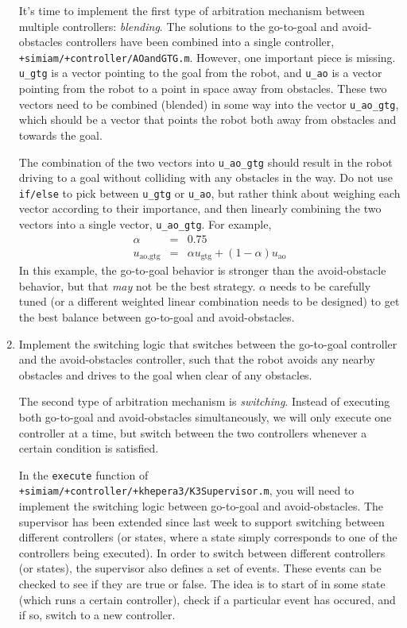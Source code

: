 \documentclass[10pt]{article}
\begin{document}
\begin{enumerate}
  It's time to implement the first type of arbitration mechanism between multiple controllers: \textit{blending}. The solutions to the go-to-goal and avoid-obstacles controllers have been combined into a single controller, \texttt{+simiam/+controller/AOandGTG.m}. However, one important piece is missing. \texttt{u\_gtg} is a vector pointing to the goal from the robot, and \texttt{u\_ao} is a vector pointing from the robot to a point in space away from obstacles. These two vectors need to be combined (blended) in some way into the vector \texttt{u\_ao\_gtg}, which should be a vector that points the robot both away from obstacles and towards the goal.
  
  The combination of the two vectors into \texttt{u\_ao\_gtg} should result in the robot driving to a goal without colliding with any obstacles in the way. Do not use \texttt{if/else} to pick between \texttt{u\_gtg} or \texttt{u\_ao}, but rather think about weighing each vector according to their importance, and then linearly combining the two vectors into a single vector, \texttt{u\_ao\_gtg}. For example,
  \begin{eqnarray*}
    \alpha &=& 0.75 \\
    u_{\text{ao,gtg}} &=& \alpha u_{\text{gtg}}+(1-\alpha)u_{\text{ao}}
  \end{eqnarray*}
  In this example, the go-to-goal behavior is stronger than the avoid-obstacle behavior, but that \textit{may} not be the best strategy. $\alpha$ needs to be carefully tuned (or a different weighted linear combination needs to be designed) to get the best balance between go-to-goal and avoid-obstacles.
  
  \item Implement the switching logic that switches between the go-to-goal controller and the avoid-obstacles controller, such that the robot avoids any nearby obstacles and drives to the goal when clear of any obstacles.
  
  The second type of arbitration mechanism is \textit{switching}. Instead of executing both go-to-goal and avoid-obstacles simultaneously, we will only execute one controller at a time, but switch between the two controllers whenever a certain condition is satisfied.
  
  In the \texttt{execute} function of \texttt{+simiam/+controller/+khepera3/K3Supervisor.m}, you will need to implement the switching logic between go-to-goal and avoid-obstacles. The supervisor has been extended since last week to support switching between different controllers (or states, where a state simply corresponds to one of the controllers being executed). In order to switch between different controllers (or states), the supervisor also defines a set of events. These events can be checked to see if they are true or false. The idea is to start of in some state (which runs a certain controller), check if a particular event has occured, and if so, switch to a new controller.
  

\end{enumerate}
\end{document}
